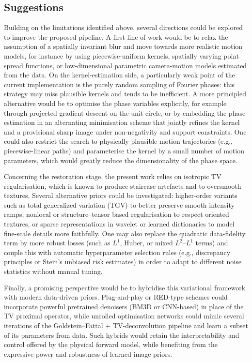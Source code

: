 \documentclass[a4paper,11pt]{article}
\begin{document}
\subsection{Suggestions}

Building on the limitations identified above, several directions could be explored to improve the proposed pipeline. A first line of work would be to relax the assumption of a spatially invariant blur and move towards more realistic motion models, for instance by using piecewise-uniform kernels, spatially varying point spread functions, or low-dimensional parametric camera-motion models estimated from the data. On the kernel-estimation side, a particularly weak point of the current implementation is the purely random sampling of Fourier phases: this strategy may miss plausible kernels and tends to be inefficient. A more principled alternative would be to optimise the phase variables explicitly, for example through projected gradient descent on the unit circle, or by embedding the phase estimation in an alternating minimisation scheme that jointly refines the kernel and a provisional sharp image under non-negativity and support constraints. One could also restrict the search to physically plausible motion trajectories (e.g., piecewise-linear paths) and parameterise the kernel by a small number of motion parameters, which would greatly reduce the dimensionality of the phase space.

Concerning the restoration stage, the present work relies on isotropic TV regularisation, which is known to produce staircase artefacts and to oversmooth textures. Several alternative priors could be investigated: higher-order variants such as total generalized variation (TGV) to better preserve smooth intensity ramps, nonlocal or structure–tensor based regularisation to respect oriented textures, or sparse representations in wavelet or learned dictionaries to model fine-scale details more faithfully. One may also replace the quadratic data-fidelity term by more robust losses (such as $L^1$, Huber, or mixed $L^2$--$L^1$ terms) and couple this with automatic hyperparameter selection rules (e.g., discrepancy principles or Stein’s unbiased risk estimates) in order to adapt to different noise statistics without manual tuning.

Finally, a promising perspective would be to hybridise this variational framework with modern data-driven priors. Plug-and-play or RED-type schemes could incorporate powerful pretrained denoisers (BM3D or CNN-based) in place of the TV proximal operator, while unrolled optimisation networks could mimic several iterations of the Goldstein--Fattal + TV-deconvolution pipeline and learn a subset of its parameters from data. Such hybrids would retain the interpretability and control offered by the physical forward model, while benefiting from the expressive power and robustness of learned image priors.
\end{document}
